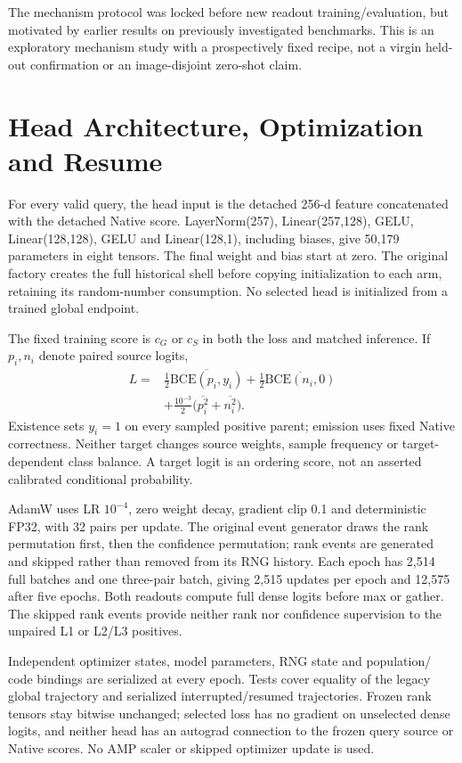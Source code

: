 \documentclass[10pt,twocolumn,letterpaper]{article}
\begin{document}
The mechanism protocol was locked before new readout training/evaluation,
but motivated by earlier results on previously investigated benchmarks.
This is an exploratory mechanism study with a prospectively fixed recipe,
not a virgin held-out confirmation or an image-disjoint zero-shot claim.

\section{Head Architecture, Optimization and Resume}
For every valid query, the head input is the detached 256-d feature
concatenated with the detached Native score. LayerNorm(257), Linear(257,128),
GELU, Linear(128,128), GELU and Linear(128,1), including biases, give
50,179 parameters in eight tensors. The final weight and bias start at zero.
The original factory creates the full historical shell before copying
initialization to each arm, retaining its random-number consumption.
No selected head is initialized from a trained global endpoint.

The fixed training score is $c_G$ or $c_S$ in both the loss and matched
inference. If $p_i,n_i$ denote paired source logits,
\begin{align}
L={}&\tfrac12\overline{\mathrm{BCE}(p_i,y_i)}
   +\tfrac12\overline{\mathrm{BCE}(n_i,0)}\nonumber\\
   &+\tfrac{10^{-3}}2\big(\overline{p_i^2}+\overline{n_i^2}\big).
\end{align}
Existence sets $y_i=1$ on every sampled positive parent; emission uses fixed
Native correctness. Neither target changes source weights, sample
frequency or target-dependent class balance. A target logit is an
ordering score, not an asserted calibrated conditional probability.

AdamW uses LR $10^{-4}$, zero weight decay, gradient clip 0.1 and
deterministic FP32, with 32 pairs per update. The original event generator
draws the rank permutation first, then the confidence permutation;
rank events are generated and skipped rather than removed from its RNG
history. Each epoch has 2,514 full batches and one three-pair batch,
giving 2,515 updates per epoch and 12,575 after five epochs.
Both readouts compute full dense logits before max or gather.
The skipped rank events provide neither rank nor confidence supervision
to the unpaired L1 or L2/L3 positives.

Independent optimizer states, model parameters, RNG state and population/
code bindings are serialized at every epoch. Tests cover equality of the
legacy global trajectory and serialized interrupted/resumed trajectories.
Frozen rank tensors stay bitwise unchanged; selected loss has no gradient
on unselected dense logits, and neither head has an autograd connection
to the frozen query source or Native scores. No AMP scaler or skipped
optimizer update is used.
\end{document}
